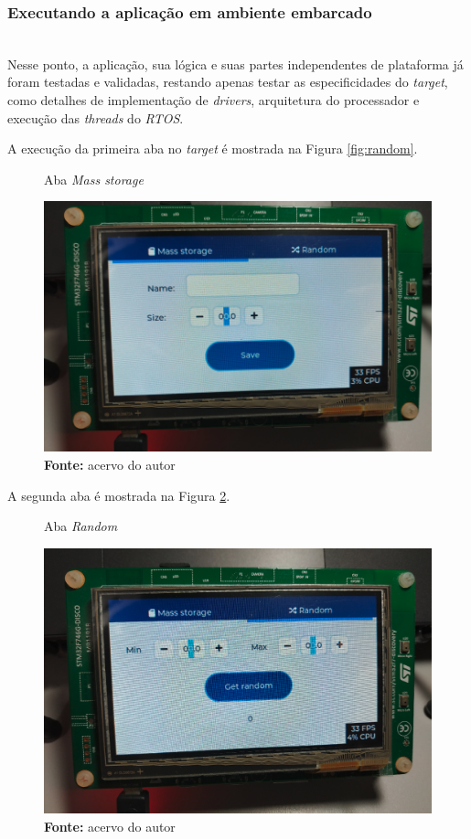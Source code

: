 \documentclass[times, twoside, watermark]{artigo}
\begin{document}
\subsubsection{Executando a aplicação em ambiente embarcado}\hfill\\

Nesse ponto, a aplicação, sua lógica e suas partes independentes de plataforma já 
foram testadas e validadas, restando apenas testar as especificidades do
\textit{target}, como detalhes de implementação de \textit{drivers}, arquitetura
do processador e execução das \textit{threads} do \textit{RTOS}.

A execução da primeira aba no \textit{target} é mostrada na 
Figura \ref{fig:random}.\hfill\

\begin{figure}[H]
  \centering
  \caption{Aba \textit{Mass storage}}
  \includegraphics[width=0.95\linewidth]{images/mass-storage-screen-embedded.png}
  \caption*{\newline\textbf{Fonte:} acervo do autor}
  \label{fig:mass-storage-embedded}
\end{figure}

A segunda aba é mostrada na Figura \ref{fig:random-embedded}.\hfill\

\begin{figure}[H]
  \centering
  
  \caption{Aba \textit{Random}}
  \includegraphics[width=0.95\linewidth]{images/random-screen-embedded.png}
  \caption*{\newline\textbf{Fonte:} acervo do autor}
  \label{fig:random-embedded}
\end{figure}
\end{document}
